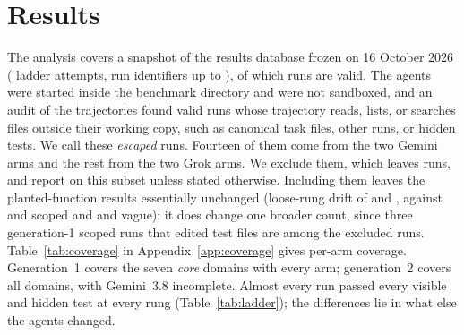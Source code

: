 \section{Results}
\label{sec:results}

The analysis covers a snapshot of the results database frozen on 16 October
2026 (\SnapshotRunCount{} ladder attempts, run identifiers up to
\SnapshotMaxRunId{}), of which \NValid{} runs are valid. The agents were
started inside the benchmark directory and were not sandboxed, and an audit of
the trajectories found \NEscapedRuns{} valid runs whose trajectory reads, lists, or searches files
outside their working copy, such as canonical task files, other runs, or hidden
tests. We call these \emph{escaped} runs. Fourteen of them come from the two Gemini arms and the rest from the two Grok
arms. We exclude them, which
leaves \NValidNoEsc{} runs, and report on this subset unless stated otherwise. Including them leaves
the planted-function results essentially unchanged (loose-rung drift of
\GoneLooseDriftFrac{} and \GtwoLooseDriftFrac{}, against \GoneScopedDriftFrac{}
and \GtwoScopedDriftFrac{} scoped and \GoneVagueDriftFrac{} and
\GtwoVagueDriftFrac{} vague); it does change one broader count, since three
generation-1 scoped runs that edited test files are among the excluded runs.
Table~\ref{tab:coverage} in Appendix~\ref{app:coverage} gives per-arm
coverage. Generation~1 covers the seven \emph{core} domains with every arm;
generation~2 covers all \NDomains{} domains, with Gemini~3.8 incomplete.
Almost every run passed every visible and hidden test at every rung
(Table~\ref{tab:ladder}); the
differences lie in what else the agents changed.

